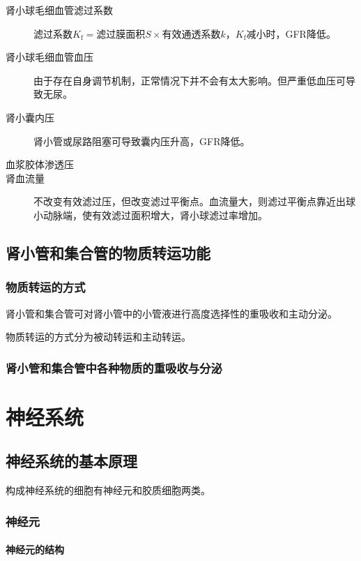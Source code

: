 \begin{description}
	\item[肾小球毛细血管滤过系数] $\text{滤过系数}K_{\text{f}}=\text{滤过膜面积}S\times\text{有效通透系数}k$，$K_{\text{f}}$减小时，GFR降低。
	\item[肾小球毛细血管血压] 由于存在自身调节机制，正常情况下并不会有太大影响。但严重低血压可导致无尿。
	\item[肾小囊内压] 肾小管或尿路阻塞可导致囊内压升高，GFR降低。
	\item[血浆胶体渗透压] 
	\item[肾血流量] 不改变有效滤过压，但改变滤过平衡点。血流量大，则滤过平衡点靠近出球小动脉端，使有效滤过面积增大，肾小球滤过率增加。
\end{description}

\subsection{肾小管和集合管的物质转运功能}

\subsubsection{物质转运的方式}

肾小管和集合管可对肾小管中的小管液进行高度选择性的重吸收和主动分泌。

物质转运的方式分为被动转运和主动转运。

\subsubsection{肾小管和集合管中各种物质的重吸收与分泌}



\section{神经系统}

\subsection{神经系统的基本原理}

构成神经系统的细胞有神经元和胶质细胞两类。

\subsubsection{神经元}

\paragraph{神经元的结构}

